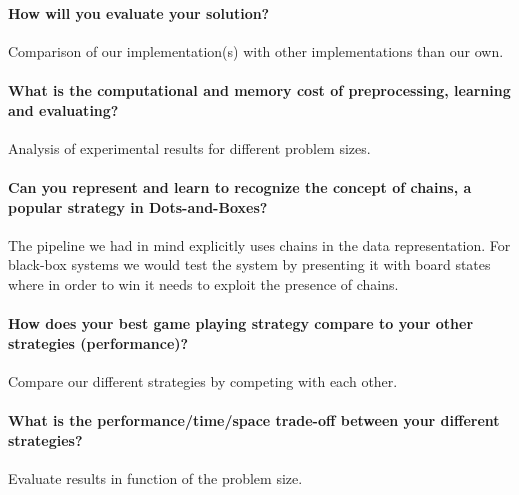 \documentclass[11pt,a4paper]{article}
\begin{document}
	\paragraph{How will you evaluate your solution?} Comparison of our implementation(s) with other implementations than our own.
	\paragraph{What is the computational and memory cost of preprocessing, learning and evaluating?} Analysis of experimental results for different problem sizes.
	\paragraph{Can you represent and learn to recognize the concept of chains, a popular strategy in Dots-and-Boxes?} The pipeline we had in mind explicitly uses chains in the data representation. For black-box systems we would test the system by presenting it with board states where in order to win it needs to exploit the presence of chains.
	\paragraph{How does your best game playing strategy compare to your other strategies (performance)?} Compare our different strategies by competing with each other.
	\paragraph{What is the performance/time/space trade-off between your different strategies?} Evaluate results in function of the problem size.
	
	
	
	
	
\end{document}
